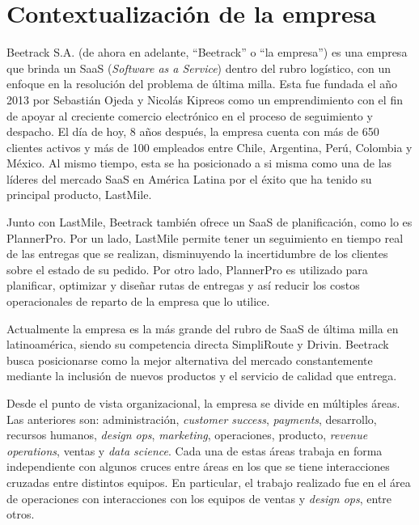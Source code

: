 \section{Contextualización de la empresa}
    
    Beetrack S.A. (de ahora en adelante, ``Beetrack'' o ``la empresa'') es una empresa que brinda un SaaS (\textit{Software as a Service}) dentro del rubro logístico, con un enfoque en la resolución del problema de última milla. Esta fue fundada el año 2013 por Sebastián Ojeda y Nicolás Kipreos como un emprendimiento con el fin de apoyar al creciente comercio electrónico en el proceso de seguimiento y despacho. El día de hoy, 8 años después, la empresa cuenta con más de 650 clientes activos y más de 100 empleados \cite{corporateit} entre Chile, Argentina, Perú, Colombia y México. Al mismo tiempo, esta se ha posicionado a si misma como una de las líderes del mercado SaaS en América Latina por el éxito que ha tenido su principal producto, LastMile.

    Junto con LastMile, Beetrack también ofrece un SaaS de planificación, como lo es PlannerPro. Por un lado, LastMile permite tener un seguimiento en tiempo real de las entregas que se realizan, disminuyendo la incertidumbre de los clientes sobre el estado de su pedido. Por otro lado, PlannerPro es utilizado para planificar, optimizar y diseñar rutas de entregas y así  reducir los costos operacionales de reparto de la empresa que lo utilice.
    
    Actualmente la empresa es la más grande del rubro de SaaS de última milla en latinoamérica, siendo su competencia directa SimpliRoute y Drivin. Beetrack busca posicionarse como la mejor alternativa del mercado constantemente mediante la inclusión de nuevos productos y el servicio de calidad que entrega.
    
    Desde el punto de vista organizacional, la empresa se divide en múltiples áreas. Las anteriores son: administración, \textit{customer success}, \textit{payments}, desarrollo, recursos humanos, \textit{design ops}, \textit{marketing}, operaciones, producto, \textit{revenue operations}, ventas y \textit{data science}. Cada una de estas áreas trabaja en forma independiente con algunos cruces entre áreas en los que se tiene interacciones cruzadas entre distintos equipos. En particular, el trabajo realizado fue en el área de operaciones con interacciones con los equipos de ventas y \textit{design ops}, entre otros.

